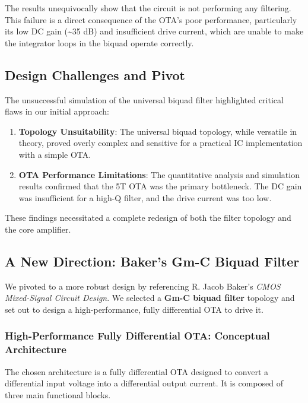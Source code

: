 \documentclass[
  letterpaper,
  DIV=11,
  numbers=noendperiod]{scrreprt}
\providecommand{\tightlist}{%
  \setlength{\itemsep}{0pt}\setlength{\parskip}{0pt}}
\begin{document}
The results unequivocally show that the circuit is not performing any
filtering. This failure is a direct consequence of the OTA's poor
performance, particularly its low DC gain (\textasciitilde35 dB) and
insufficient drive current, which are unable to make the integrator
loops in the biquad operate correctly.

\subsection{Design Challenges and
Pivot}\label{design-challenges-and-pivot}

The unsuccessful simulation of the universal biquad filter highlighted
critical flaws in our initial approach:

\begin{enumerate}
\def\labelenumi{\arabic{enumi}.}
\tightlist
\item
  \textbf{Topology Unsuitability}: The universal biquad topology, while
  versatile in theory, proved overly complex and sensitive for a
  practical IC implementation with a simple OTA.
\item
  \textbf{OTA Performance Limitations}: The quantitative analysis and
  simulation results confirmed that the 5T OTA was the primary
  bottleneck. The DC gain was insufficient for a high-Q filter, and the
  drive current was too low.
\end{enumerate}

These findings necessitated a complete redesign of both the filter
topology and the core amplifier.

\subsection{A New Direction: Baker's Gm-C Biquad
Filter}\label{a-new-direction-bakers-gm-c-biquad-filter}

We pivoted to a more robust design by referencing R. Jacob Baker's
\emph{CMOS Mixed-Signal Circuit Design}. We selected a \textbf{Gm-C
biquad filter} topology and set out to design a high-performance, fully
differential OTA to drive it.

\subsubsection{High-Performance Fully Differential OTA: Conceptual
Architecture}\label{high-performance-fully-differential-ota-conceptual-architecture}

The chosen architecture is a fully differential OTA designed to convert
a differential input voltage into a differential output current. It is
composed of three main functional blocks.
\end{document}
